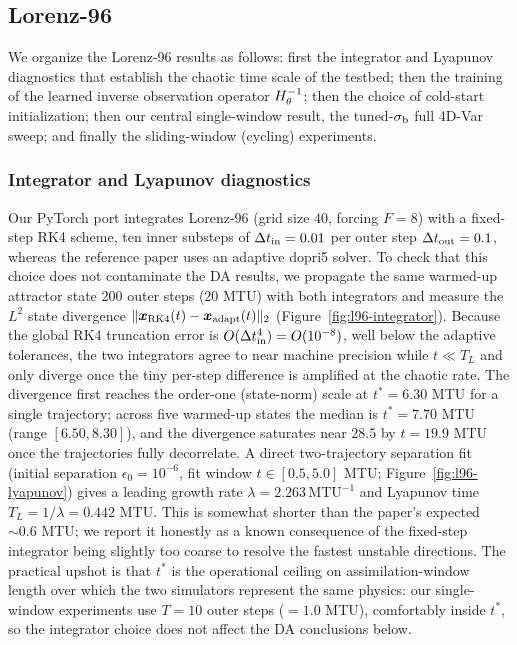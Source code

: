 \subsection{Lorenz-96}
\label{sec:results-l96}

We organize the Lorenz-96 results as follows: first the integrator and Lyapunov
diagnostics that establish the chaotic time scale of the testbed; then the training of
the learned inverse observation operator $H^{-1}_{\theta}$; then the choice of cold-start
initialization; then our central single-window result, the tuned-$\sigma_{\mathrm{b}}$ full 4D-Var
sweep; and finally the sliding-window (cycling) experiments.

\subsubsection{Integrator and Lyapunov diagnostics}

Our PyTorch port integrates Lorenz-96 (grid size $40$,
forcing $F=8$) with a fixed-step RK4 scheme, ten inner
substeps of $\Delta t_{\mathrm{in}} = 0.01$ per outer step $\Delta t_{\mathrm{out}} = 0.1$, whereas the reference paper
uses an adaptive dopri5 solver. To check
that this choice does not contaminate the DA results, we propagate
the same warmed-up attractor state $200$ outer steps ($20$ MTU) with
both integrators and measure the $L^2$ state divergence
$\lVert \bm{x}_{\mathrm{RK4}}(t) - \bm{x}_{\mathrm{adapt}}(t)\rVert_2$
(Figure~\ref{fig:l96-integrator}). Because the global RK4 truncation error is
$O(\Delta t_{\mathrm{in}}^4) = O(10^{-8})$, well below the adaptive tolerances, the two integrators
agree to near machine precision while $t \ll T_L$ and only diverge once the tiny
per-step difference is amplified at the chaotic rate. The divergence first reaches the
order-one (state-norm) scale at $t^\ast = 6.30$ MTU for a single trajectory; across five
warmed-up states the median is $t^\ast = 7.70$ MTU (range $[6.50, 8.30]$), and the
divergence saturates near $28.5$ by $t = 19.9$ MTU once the trajectories fully
decorrelate. A direct two-trajectory separation fit (initial separation
$\epsilon_0 = 10^{-6}$, fit window $t \in [0.5, 5.0]$ MTU; Figure~\ref{fig:l96-lyapunov})
gives a leading growth rate $\lambda = 2.263\,\mathrm{MTU}^{-1}$ and Lyapunov time
$T_L = 1/\lambda = 0.442$ MTU. This is somewhat shorter than the paper's expected
$\sim\!0.6$ MTU; we report it honestly as a known consequence of the fixed-step
integrator being slightly too coarse to resolve the fastest unstable directions. The
practical upshot is that $t^\ast$ is the operational ceiling on assimilation-window
length over which the two simulators represent the same physics: our single-window
experiments use $T = 10$ outer steps ($=1.0$ MTU), comfortably inside $t^\ast$, so the
integrator choice does not affect the DA conclusions below.

